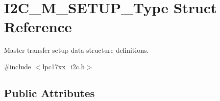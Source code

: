 \hypertarget{struct_i2_c___m___s_e_t_u_p___type}{}\section{I2\+C\+\_\+\+M\+\_\+\+S\+E\+T\+U\+P\+\_\+\+Type Struct Reference}
\label{struct_i2_c___m___s_e_t_u_p___type}


Master transfer setup data structure definitions.  




{\ttfamily \#include $<$lpc17xx\+\_\+i2c.\+h$>$}

\subsection*{Public Attributes}
